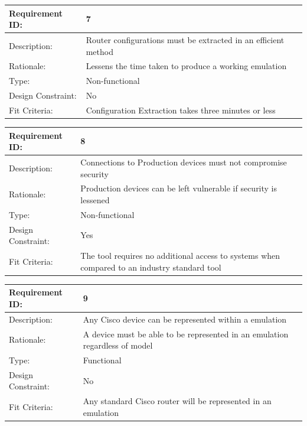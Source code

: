 \documentclass[11pt]{report}
\begin{document}
\newline
\vspace*{0.5 cm}
\newline
\begin{tabular}{|l|p{12cm}|}
	\hline Requirement ID: & 7 \\ 
	\hline Description: & Router configurations must be extracted in an efficient method \\ 
	\hline Rationale: & Lessens the time taken to produce a working emulation \\ 
	\hline Type: & Non-functional \\ 
	\hline Design Constraint: & No \\ 
	\hline Fit Criteria: & Configuration Extraction takes three minutes or less \\ 
	\hline 
\end{tabular}
\newline
\vspace*{0.5 cm}
\newline
\begin{tabular}{|l|p{12cm}|}
	\hline Requirement ID: & 8 \\ 
	\hline Description: & Connections to Production devices must not compromise security \\ 
	\hline Rationale: & Production devices can be left vulnerable if security is lessened \\ 
	\hline Type: & Non-functional \\ 
	\hline Design Constraint: & Yes \\ 
	\hline Fit Criteria: & The tool requires no additional access to systems when compared to an industry standard tool \\ 
	\hline 
\end{tabular}
\newline
\vspace*{0.5 cm}
\newline
\begin{tabular}{|l|p{12cm}|}
	\hline Requirement ID: & 9 \\ 
	\hline Description: & Any Cisco device can be represented within a emulation \\ 
	\hline Rationale: & A device must be able to be represented in an emulation regardless of model \\ 
	\hline Type: & Functional \\ 
	\hline Design Constraint: & No \\ 
	\hline Fit Criteria: & Any standard Cisco router will be represented in an emulation \\ 
	\hline 
\end{tabular}
\end{document}
